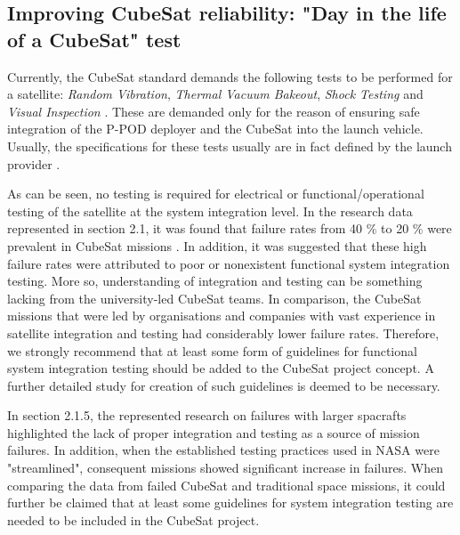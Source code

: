 \documentclass[english,12pt,a4paper,pdftex,elec,utf8]{aaltothesis}
\begin{document}
\subsection{Improving CubeSat reliability: "Day in the life of a CubeSat" test}
Currently, the CubeSat standard demands the following tests to be performed for a satellite: \textit{Random Vibration}, \textit{Thermal Vacuum Bakeout}, \textit{Shock Testing} and \textit{Visual Inspection} \cite{cds}. These are demanded only for the reason of ensuring safe integration of the P-POD deployer and the CubeSat into the launch vehicle. Usually, the specifications for these tests usually are in fact defined by the launch provider \cite{cds}.\par 
As can be seen, no testing is required for electrical or functional/operational testing of the satellite at the system integration level. In the research data represented in section 2.1, it was found that failure rates from 40 \% to 20 \% were prevalent in CubeSat missions \cite{Swart1, Swart2016, Swart2015}. In addition, it was suggested that these high failure rates were attributed to poor or nonexistent functional system integration testing. More so, understanding of integration and testing can be something lacking from the university-led CubeSat teams. In comparison, the CubeSat missions that were led by organisations and companies with vast experience in satellite integration and testing had considerably lower failure rates.
Therefore, we strongly recommend that at least some form of guidelines for functional system integration testing should be added to the CubeSat project concept. A further detailed study for creation of such guidelines is deemed to be necessary. \par
In section 2.1.5, the represented research on failures with larger spacrafts highlighted the lack of proper integration and testing as a source of mission failures. In addition, when the established testing practices used in NASA were "streamlined", consequent missions showed significant increase in failures. When comparing the data from failed CubeSat and traditional space missions, it could further be claimed that at least some guidelines for system integration testing are needed to be included in the CubeSat project. \par
\end{document}
